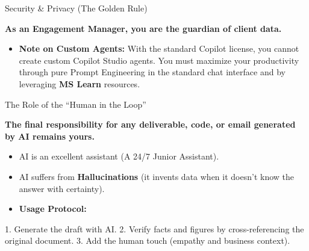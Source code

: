 \documentclass[aspectratio=169]{beamer}
\begin{document}
\begin{frame}[fragile]{Security \& Privacy (The Golden Rule)}


\textbf{As an Engagement Manager, you are the guardian of client data.}


\begin{table}
\end{table}
\begin{itemize}
  \item \textbf{Note on Custom Agents:} With the standard Copilot license, you cannot create custom Copilot Studio agents. You must maximize your productivity through pure Prompt Engineering in the standard chat interface and by leveraging \textbf{MS Learn} resources.
\end{itemize}
\end{frame}



\begin{frame}[fragile]{The Role of the ``Human in the Loop''}


\textbf{The final responsibility for any deliverable, code, or email generated by AI remains yours.}

\begin{itemize}
  \item AI is an excellent assistant (A 24/7 Junior Assistant).
  \item AI suffers from \textbf{Hallucinations} (it invents data when it doesn't know the answer with certainty).
  \item \textbf{Usage Protocol:}
\end{itemize}
1. Generate the draft with AI.
2. Verify facts and figures by cross-referencing the original document.
3. Add the human touch (empathy and business context).

\end{frame}
\end{document}

